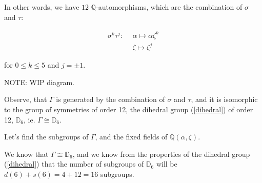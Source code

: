 \documentclass{article}
\theoremstyle{definition}
\begin{document}
In other words, we have $12$ $\mathbb{Q}$-automorphisms, which are the
combination of $\sigma$ and $\tau$:

$$\begin{aligned}
  \sigma^k \tau^j:~~&\alpha \mapsto \alpha \zeta^k\\
		    &\zeta \mapsto \zeta^j
\end{aligned}$$

for $0 \leq k \leq 5$ and $j = \pm 1$.

\vspace{0.5cm}

NOTE: WIP diagram.

\vspace{0.5cm}

Observe, that $\Gamma$ is generated by the combination of $\sigma$ and $\tau$,
and it is isomorphic to the group of symmetries of order 12, the dihedral
group (\ref{dihedral}) of order 12, $\mathbb{D}_6$, ie. $\Gamma \cong \mathbb{D}_6$.

\vspace{0.5cm}

Let's find the subgroups of $\Gamma$, and the fixed fields of $\mathbb{Q}(\alpha, \zeta)$.

We know that $\Gamma \cong \mathbb{D}_6$, and we know from the properties
of the dihedral group (\ref{dihedral}) that the number of subgroups of
$\mathbb{D}_6$ will be $d(6) + s(6) = 4 + 12 = 16$ subgroups.
\end{document}
